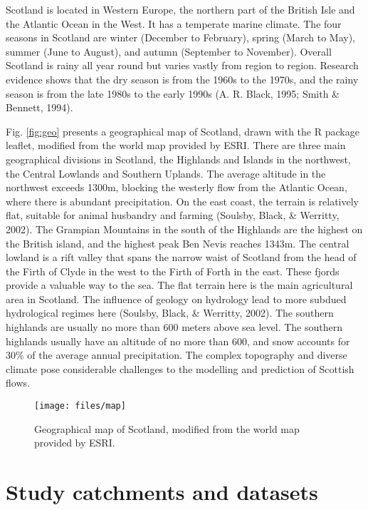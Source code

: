 \documentclass[12pt,oneside]{reedthesis}
\begin{document}
Scotland is located in Western Europe, the northern part of the British Isle and the Atlantic Ocean in the West. It has a temperate marine climate. The four seasons in Scotland are winter (December to February), spring (March to May), summer (June to August), and autumn (September to November).
Overall Scotland is rainy all year round but varies vastly from region to region. Research evidence shows that the dry season is from the 1960s to the 1970s, and the rainy season is from the late 1980s to the early 1990s (A. R. Black, 1995; Smith \& Bennett, 1994).

Fig. \ref{fig:geo} presents a geographical map of Scotland, drawn with the R package leaflet, modified from the world map provided by ESRI. There are three main geographical divisions in Scotland, the Highlands and Islands in the northwest, the Central Lowlands and Southern Uplands. The average altitude in the northwest exceeds 1300m, blocking the westerly flow from the Atlantic Ocean, where there is abundant precipitation. On the east coast, the terrain is relatively flat, suitable for animal husbandry and farming (Soulsby, Black, \& Werritty, 2002). The Grampian Mountains in the south of the Highlands are the highest on the British island, and the highest peak Ben Nevis reaches 1343m. The central lowland is a rift valley that spans the narrow waist of Scotland from the head of the Firth of Clyde in the west to the Firth of Forth in the east. These fjords provide a valuable way to the sea. The flat terrain here is the main agricultural area in Scotland. The influence of geology on hydrology lead to more subdued hydrological regimes here (Soulsby, Black, \& Werritty, 2002). The southern highlands are usually no more than 600 meters above sea level. The southern highlands usually have an altitude of no more than 600, and snow accounts for 30\% of the average annual precipitation. The complex topography and diverse climate pose considerable challenges to the modelling and prediction of Scottish flows.
\begin{figure}

{\centering \texttt{[image: files/map]} 

}

\caption{\label{fig:geo} Geographical map of Scotland, modified from the world map provided by ESRI.}\label{fig:unnamed-chunk-4}
\end{figure}
\hypertarget{study-catchments-and-datasets}{%
\section{Study catchments and datasets}\label{study-catchments-and-datasets}}
\end{document}
